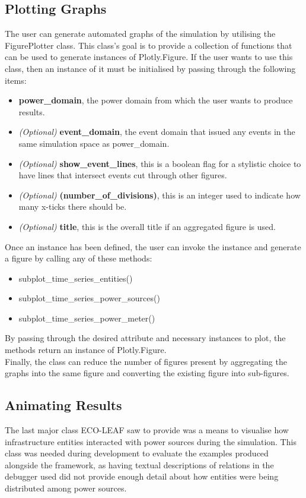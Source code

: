 \documentclass{l4proj}
\begin{document}
\subsection{Plotting Graphs}\label{subsec:imp:figureplotter}
The user can generate automated graphs of the simulation by utilising the FigurePlotter class.
This class's goal is to provide a collection of functions that can be used to generate instances of Plotly.Figure.
If the user wants to use this class, then an instance of it must be initialised by passing through the following items:
\begin{itemize}
    \item \textbf{power\_domain}, the power domain from which the user wants to produce results.
    \item \textit{(Optional)} \textbf{event\_domain}, the event domain that issued any events in the same simulation space as power\_domain.
    \item \textit{(Optional)} \textbf{show\_event\_lines}, this is a boolean flag for a stylistic choice to have lines that intersect events cut through other figures.
    \item \textit{(Optional)} \textbf{(number\_of\_divisions)}, this is an integer used to indicate how many x-ticks there should be.
    \item \textit{(Optional)} \textbf{title}, this is the overall title if an aggregated figure is used.
\end{itemize}
Once an instance has been defined, the user can invoke the instance and generate a figure by calling any of these methods:
\begin{itemize}
    \item subplot\_time\_series\_entities()
    \item subplot\_time\_series\_power\_sources()
    \item subplot\_time\_series\_power\_meter()
\end{itemize}
By passing through the desired attribute and necessary instances to plot, the methods return an instance of Plotly.Figure.\\
Finally, the class can reduce the number of figures present by aggregating the graphs into the same figure and converting the existing figure into sub-figures.

\subsection{Animating Results}\label{subsec:imp:animation}
The last major class ECO-LEAF saw to provide was a means to visualise how infrastructure entities interacted with power sources during the simulation.
This class was needed during development to evaluate the examples produced alongside the framework, as having textual descriptions of relations in the debugger used did not provide enough detail about how entities were being distributed among power sources.
\end{document}
